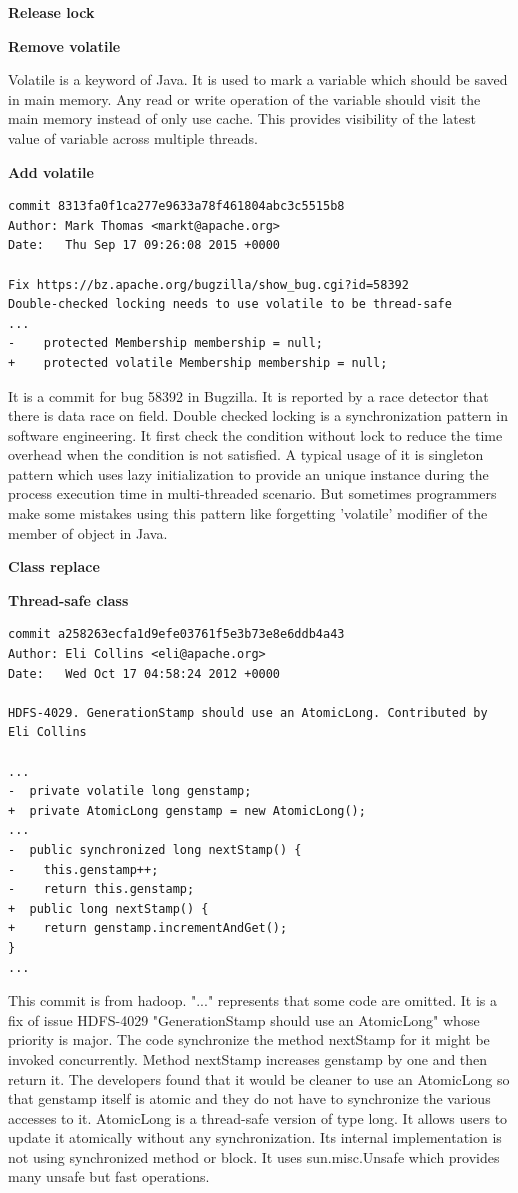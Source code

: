 \documentclass[conference]{IEEEtran}
\begin{document}
\textbf{Release lock}

\textbf{Remove volatile}

Volatile is a keyword of Java. It is used to mark a variable which should be saved in main memory. Any read or write operation of the variable should visit the main memory instead of only use cache. This provides visibility of the latest value of variable across multiple threads. 

\textbf{Add volatile}

\begin{lstlisting}
commit 8313fa0f1ca277e9633a78f461804abc3c5515b8
Author: Mark Thomas <markt@apache.org>
Date:   Thu Sep 17 09:26:08 2015 +0000

Fix https://bz.apache.org/bugzilla/show_bug.cgi?id=58392
Double-checked locking needs to use volatile to be thread-safe
...
-    protected Membership membership = null;
+    protected volatile Membership membership = null;
\end{lstlisting}
It is a commit for bug 58392 in Bugzilla. It is reported by a race detector that there is data race on field. Double checked locking is a synchronization pattern in software engineering. It first check the condition without lock to reduce the time overhead when the condition is not satisfied. A typical usage of it is singleton pattern which uses lazy initialization to provide an unique instance during the process execution time in multi-threaded scenario. But sometimes programmers make some mistakes using this pattern like forgetting 'volatile' modifier of the member of object in Java.

\textbf{Class replace}



\textbf{Thread-safe class}
\begin{lstlisting}
commit a258263ecfa1d9efe03761f5e3b73e8e6ddb4a43
Author: Eli Collins <eli@apache.org>
Date:   Wed Oct 17 04:58:24 2012 +0000

HDFS-4029. GenerationStamp should use an AtomicLong. Contributed by Eli Collins

...
-  private volatile long genstamp;
+  private AtomicLong genstamp = new AtomicLong();
...
-  public synchronized long nextStamp() {
-    this.genstamp++;
-    return this.genstamp;
+  public long nextStamp() {
+    return genstamp.incrementAndGet();
}
...
\end{lstlisting}

This commit is from hadoop. "..." represents that some code are omitted. It is a fix of issue HDFS-4029 "GenerationStamp should use an AtomicLong" whose priority is major. The code synchronize the method nextStamp for it might be invoked concurrently. Method nextStamp increases genstamp by one and then return it. The developers found that it would be cleaner to use an AtomicLong so that genstamp itself is atomic and they do not have to synchronize the various accesses to it. AtomicLong is a thread-safe version of type long. It allows users to update it atomically without any synchronization. Its internal implementation is not using synchronized method or block. It uses sun.misc.Unsafe which provides many unsafe but fast operations.
\end{document}
